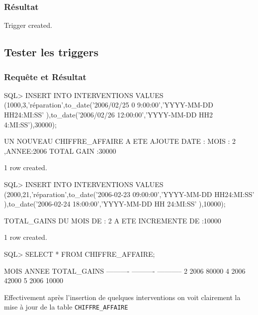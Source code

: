 \documentclass[•]{article}
\begin{document}
\subsubsection{Résultat}
\begin{sql}
Trigger created.
\end{sql}

\subsection{Tester les triggers}

\subsubsection{Requête et Résultat}
\begin{sql}
SQL> INSERT INTO INTERVENTIONS VALUES (1000,3,'réparation',to_date('2006/02/25 0
9:00:00','YYYY-MM-DD HH24:MI:SS' ),to_date('2006/02/26 12:00:00','YYYY-MM-DD HH2
4:MI:SS'),30000);

UN NOUVEAU CHIFFRE_AFFAIRE A ETE AJOUTE
DATE : MOIS : 2 ,ANNEE:2006 TOTAL GAIN :30000

1 row created.

SQL> INSERT INTO INTERVENTIONS VALUES (2000,21,'réparation',to_date('2006-02-23
09:00:00','YYYY-MM-DD HH24:MI:SS' ),to_date('2006-02-24 18:00:00','YYYY-MM-DD HH
24:MI:SS' ),10000);

TOTAL_GAINS DU MOIS DE : 2 A ETE INCREMENTE DE :10000

1 row created.


SQL> SELECT * FROM CHIFFRE_AFFAIRE;

      MOIS      ANNEE TOTAL_GAINS
---------- ---------- -----------
         2       2006       80000
         4       2006       42000
         5       2006       10000
\end{sql}

Effectivement après l'insertion de quelques interventions on voit clairement la mise à jour de la table \texttt{CHIFFRE\_AFFAIRE}
\end{document}
